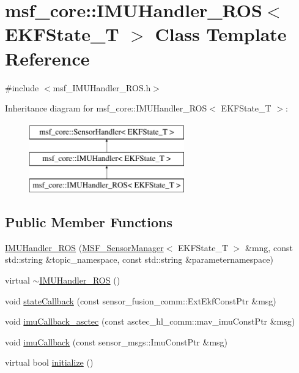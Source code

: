 \hypertarget{classmsf__core_1_1IMUHandler__ROS}{\section{msf\-\_\-core\-:\-:I\-M\-U\-Handler\-\_\-\-R\-O\-S$<$ E\-K\-F\-State\-\_\-\-T $>$ Class Template Reference}
\label{classmsf__core_1_1IMUHandler__ROS}
}


{\ttfamily \#include $<$msf\-\_\-\-I\-M\-U\-Handler\-\_\-\-R\-O\-S.\-h$>$}

Inheritance diagram for msf\-\_\-core\-:\-:I\-M\-U\-Handler\-\_\-\-R\-O\-S$<$ E\-K\-F\-State\-\_\-\-T $>$\-:\begin{figure}[H]
\begin{center}
\leavevmode
\includegraphics[height=3.000000cm]{classmsf__core_1_1IMUHandler__ROS}
\end{center}
\end{figure}
\subsection*{Public Member Functions}
\begin{DoxyCompactItemize}
\item 
\hyperlink{classmsf__core_1_1IMUHandler__ROS_ae5f7af48a65f50e446ac9286eaa162e8}{I\-M\-U\-Handler\-\_\-\-R\-O\-S} (\hyperlink{classmsf__core_1_1MSF__SensorManager}{M\-S\-F\-\_\-\-Sensor\-Manager}$<$ E\-K\-F\-State\-\_\-\-T $>$ \&mng, const std\-::string \&topic\-\_\-namespace, const std\-::string \&parameternamespace)
\item 
virtual \hyperlink{classmsf__core_1_1IMUHandler__ROS_a23c0a2175cbc4c5cc1f32f00cf08eeb1}{$\sim$\-I\-M\-U\-Handler\-\_\-\-R\-O\-S} ()
\item 
void \hyperlink{classmsf__core_1_1IMUHandler__ROS_a3ccc671b3e20d75c5b841c7834c94d9f}{state\-Callback} (const sensor\-\_\-fusion\-\_\-comm\-::\-Ext\-Ekf\-Const\-Ptr \&msg)
\item 
void \hyperlink{classmsf__core_1_1IMUHandler__ROS_a3d43bd281e85ad0c8efa9eb218be2913}{imu\-Callback\-\_\-asctec} (const asctec\-\_\-hl\-\_\-comm\-::mav\-\_\-imu\-Const\-Ptr \&msg)
\item 
void \hyperlink{classmsf__core_1_1IMUHandler__ROS_a11d2fecc4412b9664283d6e77fcaf31a}{imu\-Callback} (const sensor\-\_\-msgs\-::\-Imu\-Const\-Ptr \&msg)
\item 
virtual bool \hyperlink{classmsf__core_1_1IMUHandler__ROS_ad620c283be06fad82e81903fc527564a}{initialize} ()
\end{DoxyCompactItemize}
